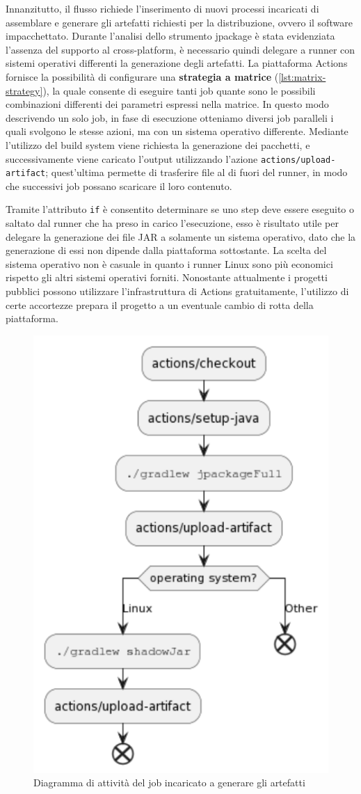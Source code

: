 Innanzitutto, il flusso richiede l'inserimento di nuovi processi incaricati di assemblare e generare gli artefatti richiesti per la distribuzione, ovvero il software impacchettato. Durante l'analisi dello strumento jpackage è stata evidenziata l'assenza del supporto al cross-platform, è necessario quindi delegare a runner con sistemi operativi differenti la generazione degli artefatti. La piattaforma Actions fornisce la possibilità di configurare una \textbf{strategia a matrice} (\cref{lst:matrix-strategy}), la quale consente di eseguire tanti job quante sono le possibili combinazioni differenti dei parametri espressi nella matrice. In questo modo descrivendo un solo job, in fase di esecuzione otteniamo diversi job paralleli i quali svolgono le stesse azioni, ma con un sistema operativo differente. Mediante l'utilizzo del build system viene richiesta la generazione dei pacchetti, e successivamente viene caricato l'output utilizzando l'azione \texttt{actions/upload-artifact}; quest'ultima permette di trasferire file al di fuori del runner, in modo che successivi job possano scaricare il loro contenuto. 



Tramite l'attributo \texttt{if} è consentito determinare se uno step deve essere eseguito o saltato dal runner che ha preso in carico l'esecuzione, esso è risultato utile per delegare la generazione dei file JAR a solamente un sistema operativo, dato che la generazione di essi non dipende dalla piattaforma sottostante. La scelta del sistema operativo non è casuale in quanto i runner Linux sono più economici rispetto gli altri sistemi operativi forniti. Nonostante attualmente i progetti pubblici possono utilizzare l'infrastruttura di Actions gratuitamente, l'utilizzo di certe accortezze prepara il progetto a un eventuale cambio di rotta della piattaforma.

\begin{figure}[htb]
	\centering
	\includegraphics[width=.5\linewidth]{figures/generate-packages-job.pdf}
	\caption{Diagramma di attività del job incaricato a generare gli artefatti}
	\label{fig:generate-packages-job}
\end{figure}

